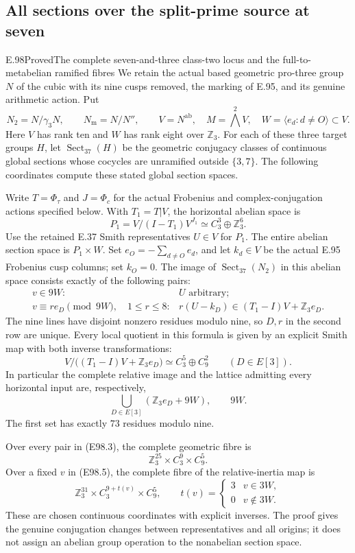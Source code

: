 \subsection{All sections over the split-prime source at seven}

\begin{statement}{E.98}{Proved}{The complete seven-and-three class-two locus and the full-to-metabelian ramified fibres}
We retain the actual based geometric pro-three group $N$ of
the cubic with its nine cusps removed, the marking of E.95,
and its genuine arithmetic action. Put
\[
 N_2=N/\gamma_3N,\qquad N_{\mathrm m}=N/N'',\qquad
 V=N^{\mathrm{ab}},\quad M=\bigwedge^2V,\quad
 W=\langle e_d:d\ne O\rangle\subset V.
 \tag{E98.1}
\]
Here $V$ has rank ten and $W$ has rank eight over $\mathbb Z_3$.
For each of these three target groups $H$, let
$\operatorname{Sect}_{37}(H)$ be the geometric conjugacy
classes of continuous global sections whose cocycles are
unramified outside $\{3,7\}$. The following coordinates
compute these stated global section spaces.

Write $T=\Phi_\tau$ and $J=\Phi_c$ for the actual
Frobenius and complex-conjugation actions specified below.
With $T_1=T|V$, the horizontal abelian space is
\[
 P_1=V/(I-T_1)V^{J_1}
       \simeq C_3^3\oplus\mathbb Z_3^6.
 \tag{E98.2}
\]
Use the retained E.37 Smith representatives $U\in V$ for
$P_1$. The entire abelian section space is $P_1\times W$.
Set $e_O=-\sum_{d\ne O}e_d$, and let $k_d\in V$ be
the actual E.95 Frobenius cusp columns; set $k_O=0$.
The image of $\operatorname{Sect}_{37}(N_2)$ in this
abelian space consists exactly of the following pairs:
\[
\begin{array}{ll}
 v\in9W:& U\text{ arbitrary};\\[2pt]
 v\equiv r e_D\pmod{9W},\quad1\le r\le8:
   &r(U-k_D)\in (T_1-I)V+\mathbb Z_3e_D .
\end{array}
 \tag{E98.3}
\]
The nine lines have disjoint nonzero residues modulo nine,
so $D,r$ in the second row are unique. Every local quotient
in this formula is given by an explicit Smith map with
both inverse transformations:
\[
 V/\bigl((T_1-I)V+\mathbb Z_3e_D\bigr)
               \simeq C_3^5\oplus C_9^2
                    \qquad(D\in E[3]).
 \tag{E98.4}
\]
In particular the complete relative image and the lattice
admitting every horizontal input are, respectively,
\[
 \bigcup_{D\in E[3]}(\mathbb Z_3e_D+9W),
                  \qquad 9W.
 \tag{E98.5}
\]
The first set has exactly $73$ residues modulo nine.

Over every pair in (E98.3), the complete geometric fibre is
\[
             \mathbb Z_3^{25}\times C_3^9\times C_9^5.
 \tag{E98.6}
\]
Over a fixed $v$ in (E98.5), the complete fibre of the
relative-inertia map is
\[
 \mathbb Z_3^{31}\times C_3^{9+t(v)}\times C_9^5,
 \qquad
 t(v)=\begin{cases}3&v\in3W,\\0&v\notin3W.\end{cases}
 \tag{E98.7}
\]
These are chosen continuous coordinates with explicit
inverses. The proof gives the genuine conjugation changes
between representatives and all origins; it does not
assign an abelian group operation to the nonabelian
section space.


\end{statement}
